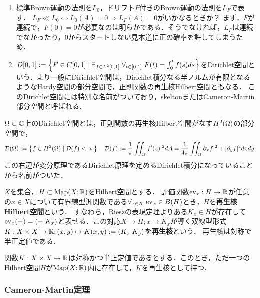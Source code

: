 \documentclass[uplatex,dvipdfmx]{jsreport}
\begin{document}
\begin{notation}\mbox{}
    \begin{enumerate}
        \item 標準Brown運動の法則を$L_0$，ドリフト$F$付きのBrown運動の法則を$L_F$で表す．
        $L_F\ll L_0\Leftrightarrow L_0(A)=0\Rightarrow L_F(A)=0$がいかなるときか？
        まず，$F$が連続で，$F(0)=0$が必要なのは明らかである．そうでなければ，$L_F$は連続でなかったり，$0$からスタートしない見本道に正の確率を許してしまうため．
        \item $D[0,1]:=\left\{F\in C[0,1]\mid\exists_{f\in L^2[0,1]}\;\forall_{t\in[0,1]}\;F(t)=\int^t_0f(s)ds\right\}$をDirichlet空間という．より一般にDirichlet空間は，Dirichlet積分なる半ノルムが有限となるようなHardy空間の部分空間で，正則関数の再生核Hilbert空間ともなる．
        このDirichlet空間には特別な名前がついており，skeltonまたはCameron-Martin部分空間と呼ばれる．
    \end{enumerate}
\end{notation}

\begin{definition}
    $\Omega\subset\mathbb{C}$上のDirichlet空間とは，正則関数の再生核Hilbert空間がなす$H^2(\Omega)$の部分空間で，
    \[\mathcal{D}(\Omega):=\left\{f\in H^2(\Omega)\mid \mathcal{D}(f)<\infty\right\}\quad\mathcal{D}(f):=\frac{1}{\pi}\iint_\Omega\lvert f'(z)\rvert^2dA=\frac{1}{4\pi}\iint_\Omega\lvert\partial_xf\rvert^2+\lvert\partial_yf\rvert^2dxdy.\]
    この右辺が変分原理であるDirichlet原理を定めるDirichlet積分になっていることから名前がついた．
\end{definition}
\begin{definition}
    $X$を集合，$H\subset\mathrm{Map}(X;\mathbb{R})$をHilbert空間とする．
    評価関数$\mathrm{ev}_x:H\to\mathbb{R}$が任意の$x\in X$について有界線型汎関数である$\forall_{x\in X}\;\mathrm{ev}_x\in B(H)$とき，$H$を\textbf{再生核Hilbert空間}という．
    すなわち，Rieszの表現定理よりある$K_x\in H$が存在して$\mathrm{ev}_x(-)=(-|K_x)$と表せる．この対応$X\to H;x\mapsto K_x$が導く双線型形式$K:X\times X\to\mathbb{R};(x,y)\mapsto K(x,y):=(K_x|K_y)$を\textbf{再生核}という．
    再生核は対称で半正定値である．
\end{definition}
\begin{theorem}
    関数$K:X\times X\to\mathbb{R}$は対称かつ半正定値であるとする．このとき，ただ一つのHilbert空間$H$が$\mathrm{Map}(X;\mathbb{R})$内に存在して，$K$を再生核として持つ．
\end{theorem}

\subsubsection{Cameron-Martin定理}
\end{document}
